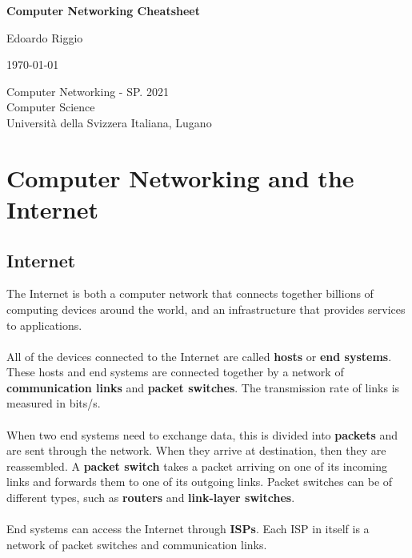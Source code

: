 \documentclass{article}
\begin{document}
\begin{titlepage}
    \begin{center}
        \vspace*{1cm}
        
        \Huge
        \textbf{Computer Networking Cheatsheet}
        
        \vspace{0.5cm}
        \LARGE
        
        \vspace{.5cm}
        
        Edoardo Riggio
   		  \vspace{1.5cm}
       
        \vfill
        
        \today
        
        \vspace{.8cm}
          \Large
          Computer Networking - SP. 2021 \\
        Computer Science\\
        Universit\`{a} della Svizzera Italiana, Lugano\\
        
    \end{center}
\end{titlepage}

\tableofcontents

\newpage

\section{Computer Networking and the Internet}
\subsection{Internet}
The Internet is both a computer network that connects together billions of computing devices around the world, and an infrastructure that provides services to applications. \\ \\
All of the devices connected to the Internet are called \textbf{hosts} or \textbf{end systems}. These hosts and end systems are connected together by a network of \textbf{communication links} and \textbf{packet switches}. The transmission rate of links is measured in bits/s. \\ \\
When two end systems need to exchange data, this is divided into \textbf{packets} and are sent through the network. When they arrive at destination, then they are reassembled. A \textbf{packet switch} takes a packet arriving on one of its incoming links and forwards them to one of its outgoing links. Packet switches can be of different types, such as \textbf{routers} and \textbf{link-layer switches}. \\ \\
End systems can access the Internet through \textbf{ISPs}. Each ISP in itself is a network of packet switches and communication links.
\end{document}
